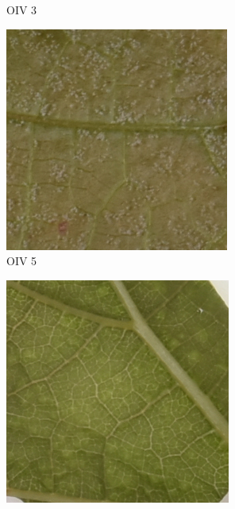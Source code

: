 \documentclass[english]{article}
\begin{document}
\begin{figure}[H]
\begin{subfigure}[b]{0.3\linewidth}
        \caption{OIV 3}\label{fig:issueblur}
    \end{subfigure}
    \begin{subfigure}[b]{0.3\linewidth}
        \includegraphics[width=\linewidth]{Exp21DM03_inoc3_T4_P32_c_1.png}
        \caption{OIV 5}\label{fig:issuecolor}
    \end{subfigure}
    \begin{subfigure}[b]{0.3\linewidth}
        \includegraphics[width=\linewidth]{Exp21DM13_inoc2_T0_P34_b_1.png}

\end{subfigure}
\end{figure}
\end{document}
